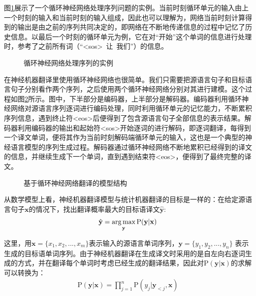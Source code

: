 \parinterval 图\ref{fig:6-9}展示了一个循环神经网络处理序列问题的实例。当前时刻循环单元的输入由上一个时刻的输入和当前时刻的输入组成，因此也可以理解为，网络当前时刻计算得到的输出是由之前的序列共同决定的，即网络在不断地传递信息的过程中记忆了历史信息。以最后一个时刻的循环单元为例，它在对``开始''这个单词的信息进行处理时，参考了之前所有词（``<sos>\ 让\ 我们''）的信息。

\begin{figure}[htp]
\centering

\caption{循环神经网络处理序列的实例}
\label{fig:6-9}
\end{figure}

\parinterval 在神经机器翻译里使用循环神经网络也很简单。我们只需要把源语言句子和目标语言句子分别看作两个序列，之后使用两个循环神经网络分别对其进行建模。这个过程如图\ref{fig:6-10}所示。图中，下半部分是编码器，上半部分是解码器。编码器利用循环神经网络对源语言序列逐词进行编码处理，同时利用循环单元的记忆能力，不断累积序列信息，遇到终止符<eos>后便得到了包含源语言句子全部信息的表示结果。解码器利用编码器的输出和起始符<sos>开始逐词的进行解码，即逐词翻译，每得到一个译文单词，便将其作为当前时刻解码端循环单元的输入，这也是一个典型的神经语言模型的序列生成过程。解码器通过循环神经网络不断地累积已经得到的译文的信息，并继续生成下一个单词，直到遇到结束符<eos>，便得到了最终完整的译文。

\begin{figure}[htp]
\centering

\caption{基于循环神经网络翻译的模型结构}
\label{fig:6-10}
\end{figure}

\parinterval 从数学模型上看，神经机器翻译模型与统计机器翻译的目标是一样的：在给定源语言句子$\mathbf{x}$的情况下，找出翻译概率最大的目标语译文$\hat{\mathbf{y}}$:
\begin{eqnarray}
\hat{\mathbf{y}} = \operatorname*{arg\,max}_{\mathbf{y}} \textrm{P} (\mathbf{y} | \mathbf{x})
\label{eq:6-1}
\end{eqnarray}

\noindent 这里，用$\mathbf{x}=\{ x_1,x_2,..., x_m \}$表示输入的源语言单词序列，$\mathbf{y}=\{ y_1,y_2,..., y_n \}$ 表示生成的目标语单词序列。由于神经机器翻译在生成译文时采用的是自左向右逐词生成的方式，并在翻译每个单词时考虑已经生成的翻译结果，因此对$\textrm{P} (\mathbf{y} | \mathbf{x})$的求解可以转换为：
\begin{eqnarray}
\textrm{P} (\mathbf{y} | \mathbf{x}) = \prod_{j=1}^{n} \textrm{P} ( y_j | \mathbf{y}_{<j }, \mathbf{x}  )
\label{eq:6-2}
\end{eqnarray}


